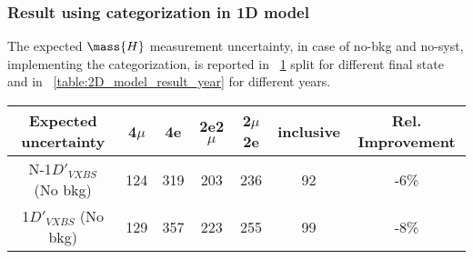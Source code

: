\subsubsection{Result using categorization in 1D model}
The expected $\mass{H}$ measurement uncertainty, in case of no-bkg and no-syst,
implementing the categorization, is reported in \tablename~\ref{table:2D_model_result}
split for different final state and in \tablename~\ref{table:2D_model_result_year} for different
years.
\begin{table}[ht]	
\begin{center}
    \begin{tabular}{ccccccc}
    \hline			
    Expected uncertainty	&	4$\mu$	&	4e	&	2e2$\mu$	&2$\mu$2e	& inclusive & Rel. Improvement \\
    \hline			
        N-1$D'_{VXBS}$ (No bkg)	&	124	&	319	&	203	&	236	&	92	&	-6\%	\\
        1$D'_{VXBS}$ (No bkg)	&	129	&	357	&	223	&	255	&	99	&	-8\%	\\
    \hline
    \end{tabular}
\label{table:2D_model_result}
\end{center}
\end{table}
